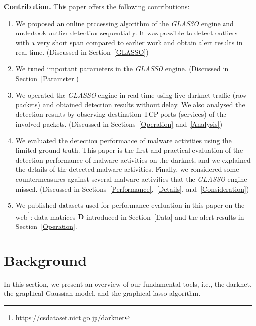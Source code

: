 \documentclass[conference]{IEEEtran}
\begin{document}
\noindent
\textbf{Contribution.}\space\space
This paper offers the following contributions:
\begin{enumerate}
	\item We proposed an online processing algorithm of the \textit{GLASSO} engine and undertook outlier detection sequentially.
  It was possible to detect outliers with a very short span compared to earlier work and obtain alert results in real time. (Discussed in Section~\ref{GLASSO})
	\item We tuned important parameters in the \textit{GLASSO} engine. (Discussed in Section~\ref{Parameter})
	\item We operated the \textit{GLASSO} engine in real time using live darknet traffic (raw packets) and obtained detection results without delay.
  We also analyzed the detection results by observing destination TCP ports (services) of the involved packets. (Discussed in Sections~\ref{Operation} and~\ref{Analysis})
  \item We evaluated the detection performance of malware activities using the limited ground truth.
  This paper is the first and practical evaluation of the detection performance of malware activities on the darknet, and we explained the details of the detected malware activities.
  Finally, we considered some countermeasures against several malware activities that the \textit{GLASSO} engine missed. (Discussed in Sections~\ref{Performance},~\ref{Details}, and~\ref{Consideration})
  \item We published datasets used for performance evaluation in this paper on the web\footnote{https://csdataset.nict.go.jp/darknet}: data matrices $\bm{D}$ introduced in Section~\ref{Data} and the alert results in Section~\ref{Operation}.
\end{enumerate}



\section{Background}
In this section, we present an overview of our fundamental tools, i.e., the darknet, the graphical Gaussian model, and the graphical lasso algorithm.
\end{document}
